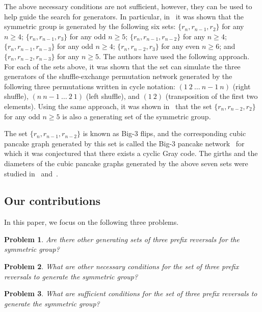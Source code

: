 \documentclass[
final
]{dmtcs-episciences}
\newtheorem{problem}{Problem}
\begin{document}
The above necessary conditions are not sufficient, however, they can be used to help guide the search for generators. In particular, in~\cite{BS03} it was shown that the symmetric group is generated by the following six sets: $\{r_n,r_{n-1},r_2\}$ for any $n \geqslant 4$; $\{r_n,r_{n-1},r_3\}$ for any odd $n \geqslant 5$; $\{r_n,r_{n-1},r_{n-2}\}$ for any $n \geqslant 4$; $\{r_n,r_{n-1},r_{n-3}\}$ for any odd $n \geqslant 4$; $\{r_n,r_{n-2},r_3\}$ for any even $n \geqslant 6$; and $\{r_n,r_{n-2},r_{n-3}\}$ for any $n \geqslant 5$. The authors have used the following approach. For each of the sets above, it was shown that the set can simulate the three generators of the shuffle-exchange permutation network generated by the following three permutations written in cycle notation: $( 1\ 2\ \ldots \ n-1\ n)$ (right shuffle), $(n\ n-1\ \ldots \ 2\ 1)$ (left shuffle), and $(1\ 2)$ (transposition of the first two elements). Using the same approach, it was shown in~\cite{Gun22} that the set $\{r_n,r_{n-2},r_2\}$ for any odd $n \geqslant 5$ is also a generating set of the symmetric group.  

The set $\{r_n,r_{n-1},r_{n-2}\}$ is known as Big-3 flips, and the corresponding cubic pancake graph generated by this set is called the Big-3 pancake network~\cite{SW16} for which it was conjectured that there exists a cyclic Gray code. The girths and the diameters of the cubic pancake graphs generated by the above seven sets were studied in~\cite{KS22} and~\cite{CayleyPy}.

\subsection{Our contributions}

\medskip

In this paper, we focus on the following three problems.

\begin{problem}\label{Prob1}
Are there other generating sets of three prefix reversals for the symmetric group?
\end{problem}

\begin{problem}\label{Prob2}
What are other necessary conditions for the set of three prefix reversals to generate the symmetric group?
\end{problem}

\begin{problem}\label{Prob3}
What are sufficient conditions for the set of three prefix reversals to generate the symmetric group?
\end{problem}
\end{document}
